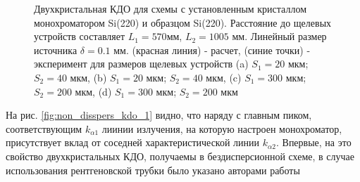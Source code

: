 \begin{figure}[H]
  \caption{Двухкристальная КДО для схемы с установленным кристаллом монохроматором Si(220) и образцом  Si(220). Расстояние до щелевых устройств
  составляет $L_1= 570 $мм, $L_2 = 1005$ мм. Линейный размер источника $\delta = 0.1$ мм. (красная линия) - расчет, (синие точки) - эксперимент
  для размеров щелевых устройств (a) $S_1 = 20 $ мкм; $ S_2 = 40$ мкм, (b) $S_1 = 20 $ мкм; $ S_2 = 40$ мкм,
  (c) $S_1 = 300 $ мкм; $ S_2 = 200$ мкм, (d) $S_1 = 300 $ мкм; $ S_2 = 200$ мкм}
  \label{ris:non_disspers_kdo}
\end{figure}

На рис. \ref{fig:non_disspers_kdo_1} видно, что наряду с главным пиком, соответствующим $k_{\alpha1}$ лиинии
излучения, на которую настроен монохроматор, присутствует вклад от соседней характеристической линии
 $k_{\alpha2}$. Впервые, на это свойство двухкристальных КДО, получаемы в бездисперсионной
схеме, в случае использования рентгеновской трубки было указано авторами работы \cite{chuev2008}
